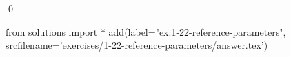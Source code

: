 
\begin{ex}
  \label{ex:1-22-reference-parameters}
  
  \qed
\end{ex}
\begin{python0}
from solutions import *
add(label="ex:1-22-reference-parameters",
    srcfilename='exercises/1-22-reference-parameters/answer.tex')
\end{python0}
